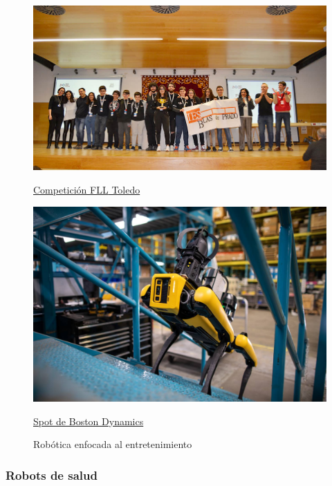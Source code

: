 \begin{figure}[ht!]
	\centering
	\begin{minipage}{0.3\linewidth}
		\centering
		\includegraphics[width=\linewidth]{figs/FLL_TO19.jpg}
		\caption*{\centering\href{https://www.uclm.es/noticias/febrero2019/toledo/finalfirstlegoleague}{Competición \ac{FLL} Toledo} }
	\end{minipage}
	\hspace{3cm}
	\begin{minipage}{0.3\linewidth}
		\centering
		\includegraphics[width=\linewidth]{figs/spot.jpg}
		\caption*{\centering\href{https://bostondynamics.com/products/spot/}{Spot de Boston Dynamics}}
	\end{minipage}
	\caption{Robótica enfocada al entretenimiento}
	\label{fig:robed}
\end{figure}


\subsubsection{Robots de salud}

